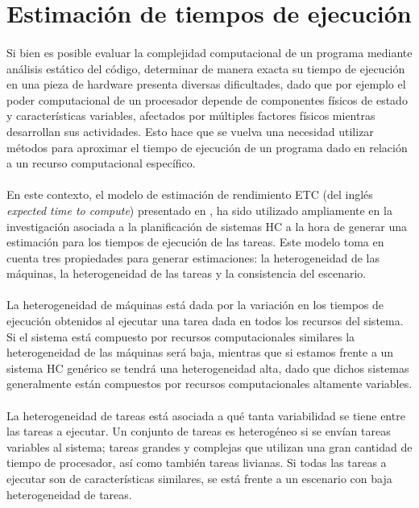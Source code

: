 \section{Estimación de tiempos de ejecución} \label{section:descripcion-problema,subsection:estimacion-tiempo-ejecucion}

\paragraph{}Si bien es posible evaluar la complejidad computacional de un programa mediante análisis estático del código, determinar de manera exacta su tiempo de ejecución en una pieza de hardware presenta diversas dificultades, dado que por ejemplo el poder computacional de un procesador depende de componentes físicos de estado y características variables, afectados por múltiples factores físicos mientras desarrollan sus actividades. Esto hace que se vuelva una necesidad utilizar métodos para aproximar el tiempo de ejecución de un programa dado en relación a un recurso computacional específico.

\paragraph{}En este contexto, el modelo de estimación de rendimiento ETC (del inglés \textit{expected time to compute}) presentado en \citet{bib-ali-hc-etc}, ha sido utilizado ampliamente en la investigación asociada a la planificación de sistemas HC a la hora de generar una estimación para los tiempos de ejecución de las tareas. Este modelo toma en cuenta tres propiedades para generar estimaciones: la heterogeneidad de las máquinas, la heterogeneidad de las tareas y la consistencia del escenario.

\paragraph{}La heterogeneidad de máquinas está dada por la variación en los tiempos de ejecución obtenidos al ejecutar una tarea dada en todos los recursos del sistema. Si el sistema está compuesto por recursos computacionales similares la heterogeneidad de las máquinas será baja, mientras que si estamos frente a un sistema HC genérico se tendrá una heterogeneidad alta, dado que dichos sistemas generalmente están compuestos por recursos computacionales altamente variables.

\paragraph{}La heterogeneidad de tareas está asociada a qué tanta variabilidad se tiene entre las tareas a ejecutar. Un conjunto de tareas es heterogéneo si se envían tareas variables al sistema; tareas grandes y complejas que utilizan una gran cantidad de tiempo de procesador, así como también tareas livianas. Si todas las tareas a ejecutar son de características similares, se está frente a un escenario con baja heterogeneidad de tareas.

